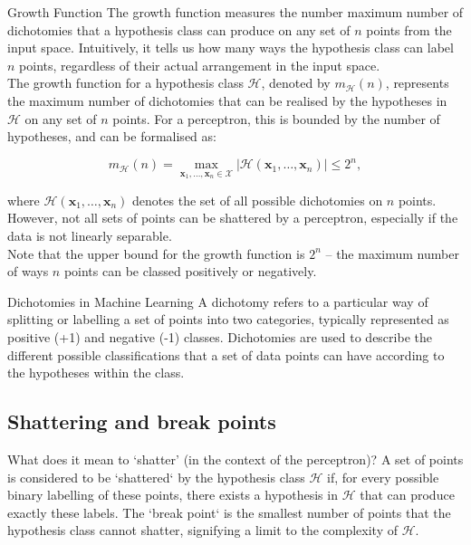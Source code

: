 \begin{definitionbox}{Growth Function}\label{growth_func}
The growth function measures the number maximum number of dichotomies that a hypothesis class can produce on any set of $n$ points from the input space. Intuitively, it tells us how many ways the hypothesis class can label $n$ points, regardless of their actual arrangement in the input space.\\

The growth function for a hypothesis class \( \mathcal{H} \), denoted by \( m_{\mathcal{H}}(n) \), represents the maximum number of dichotomies that can be realised by the hypotheses in \( \mathcal{H} \) on any set of \( n \) points. For a perceptron, this is bounded by the number of hypotheses, and can be formalised as:

\begin{equation*}
    m_{\mathcal{H}}(n) = \max_{\textbf{x}_1,\ldots,\textbf{x}_n \in \mathcal{X}} |\mathcal{H}(\textbf{x}_1, \ldots, \textbf{x}_n)| \leq 2^n,
\end{equation*}

where \( \mathcal{H}(\textbf{x}_1, \ldots, \textbf{x}_n) \) denotes the set of all possible dichotomies on \( n \) points. However, not all sets of points can be shattered by a perceptron, especially if the data is not linearly separable. \\

Note that the upper bound for the growth function is $2^n$ – the maximum number of ways $n$ points can be classed positively or negatively. 
\end{definitionbox}

\begin{definitionbox}{Dichotomies in Machine Learning}
    A dichotomy refers to a particular way of splitting or labelling a set of points into two categories, typically represented as positive (+1) and negative (-1) classes. Dichotomies are used to describe the different possible classifications that a set of data points can have according to the hypotheses within the class.
\end{definitionbox}


\subsection{Shattering and break points}



\begin{definitionbox}{What does it mean to `shatter' (in the context of the perceptron)?}
A set of points is considered to be `shattered` by the hypothesis class \( \mathcal{H} \) if, for every possible binary labelling of these points, there exists a hypothesis in \( \mathcal{H} \) that can produce exactly these labels. The `break point` is the smallest number of points that the hypothesis class cannot shatter, signifying a limit to the complexity of \( \mathcal{H} \).
\end{definitionbox}

